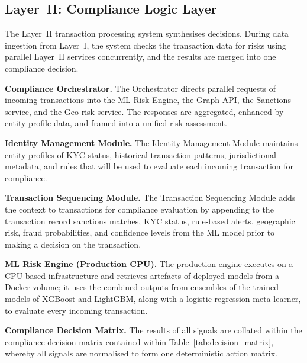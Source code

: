 \documentclass[journal]{IEEEtran}
\begin{document}
\subsection{Layer~II: Compliance Logic Layer}

The Layer~II transaction processing system synthesises decisions. During data ingestion from Layer~I, the system checks the transaction data for risks using parallel Layer~II services concurrently, and the results are merged into one compliance decision.

\textbf{Compliance Orchestrator.} The Orchestrator directs parallel requests of incoming transactions into the ML Risk Engine, the Graph API, the Sanctions service, and the Geo-risk service. The responses are aggregated, enhanced by entity profile data, and framed into a unified risk assessment.

\textbf{Identity Management Module.} The Identity Management Module maintains entity profiles of KYC status, historical transaction patterns, jurisdictional metadata, and rules that will be used to evaluate each incoming transaction for compliance.

\textbf{Transaction Sequencing Module.} The Transaction Sequencing Module adds the context to transactions for compliance evaluation by appending to the transaction record sanctions matches, KYC status, rule-based alerts, geographic risk, fraud probabilities, and confidence levels from the ML model prior to making a decision on the transaction.

\textbf{ML Risk Engine (Production CPU).} The production engine executes on a CPU-based infrastructure and retrieves artefacts of deployed models from a Docker volume; it uses the combined outputs from ensembles of the trained models of XGBoost and LightGBM, along with a logistic-regression meta-learner, to evaluate every incoming transaction.

\textbf{Compliance Decision Matrix.} The results of all signals are collated within the compliance decision matrix contained within Table~\ref{tab:decision_matrix}, whereby all signals are normalised to form one deterministic action matrix.
\end{document}
